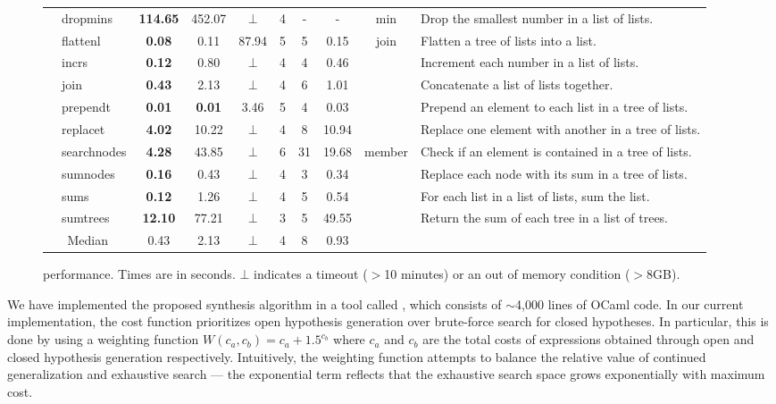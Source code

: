 \begin{figure*}[c]
\begin{tabular}{| l | l | c | c | c | c | c | c | c | p{6.3cm} |}
& dropmins & \textbf{114.65} & 452.07 & $\bot$ & 4 & - & - & min & Drop the smallest number in a list of lists. \\
& flattenl & \textbf{0.08} & 0.11 & 87.94 & 5 & 5 & 0.15 & join & Flatten a tree of lists into a list. \\
& incrs & \textbf{0.12} & 0.80 & $\bot$ & 4 & 4 & 0.46 &  & Increment each number in a list of lists. \\
& join & \textbf{0.43} & 2.13 & $\bot$ & 4 & 6 & 1.01 &  & Concatenate a list of lists together. \\
& prependt & \textbf{0.01} & \textbf{0.01} & 3.46 & 5 & 4 & 0.03 &  & Prepend an element to each list in a tree of lists. \\
& replacet & \textbf{4.02} & 10.22 & $\bot$ & 4 & 8 & 10.94 &  & Replace one element with another in a tree of lists. \\
& searchnodes & \textbf{4.28} & 43.85 & $\bot$ & 6 & 31 & 19.68 & member & Check if an element is contained in a tree of lists. \\
& sumnodes & \textbf{0.16} & 0.43 & $\bot$ & 4 & 3 & 0.34 &  & Replace each node with its sum in a tree of lists. \\
& sums & \textbf{0.12} & 1.26 & $\bot$ & 4 & 5 & 0.54 &  & For each list in a list of lists, sum the list. \\
& sumtrees & \textbf{12.10} & 77.21 & $\bot$ & 3 & 5 & 49.55 &  &
Return the sum of each tree in a list of trees. \\
\hline


\multicolumn{2}{|c|}{Median} & 0.43 & 2.13 & $\bot$ & 4 & 8 & 0.93 & \multicolumn{2}{|c|}{} \\
\hline

  \end{tabular}
  \caption{\sys performance. Times are in
    seconds. $\bot$ indicates a timeout ($>$10 minutes) or an out of
    memory condition ($>$8GB).}
\label{fig:example-desc}
\end{figure*}


We have implemented the proposed synthesis algorithm  in
a tool called \sys, which consists of
$\sim$4,000 lines of OCaml code. In our current implementation, the
cost function prioritizes open hypothesis generation over brute-force
search for closed hypotheses. In particular, this is done by using a
weighting function $W(c_a, c_b) = c_a + 1.5 ^{c_b}$ where $c_a$ and
$c_b$ are the total costs of expressions obtained through open and
closed hypothesis generation respectively.  Intuitively, the weighting
function attempts to balance the relative value of continued
generalization and exhaustive search --- the exponential term reflects
that the exhaustive search space grows exponentially with maximum cost.


